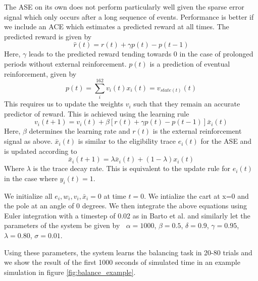 \documentclass{article}
\begin{document}
The ASE on its own does not perform particularly well given the sparse error signal which only occurs after a long sequence of events. Performance is better if we include an ACE which estimates a predicted reward at all times.
The predicted reward is given by
\begin{equation}
\hat r(t) = r(t) + \gamma p(t) - p(t-1)
\end{equation}
Here, $\gamma$ leads to the predicted reward tending towards 0 in the case of prolonged periods without external reinforcement.
$p(t)$ is a prediction of eventual reinforcement, given by
\begin{equation}
p(t) = \sum_i^{162}{v_i(t)x_i(t) = v_{state(t)}(t)}
\end{equation}
This requires us to update the weights $v_i$ such that they remain an accurate predictor of reward. This is achieved using the learning rule
\begin{equation}
v_i(t+1) = v_i(t) + \beta[r(t) + \gamma p(t) - p(t-1)] \bar x_i(t)
\end{equation}
Here, $\beta$ determines the learning rate and $r(t)$ is the external reinforcement signal as above. $\bar x_i(t)$ is similar to the eligibility trace $e_i(t)$ for the ASE and is updated according to
\begin{equation}
\bar x_i(t+1) = \lambda \bar x_i(t) + (1-\lambda)x_i(t) 
\end{equation}
Where $\lambda$ is the trace decay rate. This is equivalent to the update rule for $e_i(t)$ in the case where $y_i(t) = 1$.


We initialize all $e_i, w_i, v_i, \bar x_i = 0$ at time $t=0$.
We intialize the cart at x=0 and the pole at an angle of 0 degrees.
We then integrate the above equations using Euler integration with a timestep of 0.02 as in Barto et al. and similarly let the parameters of the system be given by $~$
$\alpha = 1000$,
$\beta = 0.5$,
$\delta = 0.9$,
$\gamma = 0.95$,
$\lambda = 0.80$,
$\sigma = 0.01$.

Using these parameters, the system learns the balancing task in 20-80 trials and we show the result of the first 1000 seconds of simulated time in an example simulation in figure \ref{fig:balance_example}.
\end{document}
